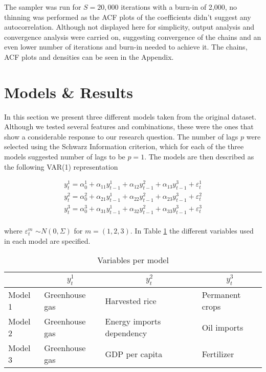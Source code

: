 \documentclass[12pt]{article}
\begin{document}
The sampler was run for $S=20,000$ iterations with a burn-in of 2,000, no thinning was performed as the ACF plots of the coefficients didn't suggest any autocorrelation. Although not displayed here for simplicity, output analysis and convergence analysis were carried on, suggesting convergence of the chains and an even lower number of iterations and burn-in needed to achieve it. The chains, ACF plots and densities can be seen in the Appendix.

\clearpage

\section{Models \& Results} \label{Models & Results}

In this section we present three different models taken from the original dataset. Although we tested several features and combinations, these were the ones that show a considerable response to our research question. The number of lags $p$ were selected using the Schwarz Information criterion, which for each of the three models suggested number of lags to be $p=1$. The models are then described as the following VAR(1) representation

\begin{equation}\label{GIRF_2}
\begin{split}
y^{1}_{t} = \alpha_{0}^{1}+\alpha_{11}y^{1}_{t-1}+\alpha_{12}y^{2}_{t-1}+\alpha_{13}y^{3}_{t-1}+\varepsilon^{1}_{t} \\
y^{2}_{t} = \alpha_{0}^{2}+\alpha_{21}y^{1}_{t-1}+\alpha_{22}y^{2}_{t-1}+\alpha_{23}y^{3}_{t-1}+\varepsilon^{2}_{t} \\
y^{3}_{t} =\alpha_{0}^{3}+ \alpha_{31}y^{1}_{t-1}+\alpha_{32}y^{2}_{t-1}+\alpha_{33}y^{3}_{t-1}+\varepsilon^{3}_{t} \\
\end{split}
\end{equation}

where $\varepsilon^{m}_{t}$ $\sim N(0,\Sigma)$ for $m=(1,2,3)$. In Table \ref{tab:models_spec} the different variables used in each model are specified.

\begin{table}[H]
    \begin{center}
     \begin{tabular}{llll} \hline
         & \multicolumn{1}{c}{\textbf{$y^{1}_{t}$}}  & \multicolumn{1}{c}{\textbf{$y^{2}_{t}$}} & \multicolumn{1}{c}{\textbf{$y^{3}_{t}$}} \\ \hline
        Model 1 & Greenhouse gas & Harvested rice & Permanent crops \\
        Model 2 & Greenhouse gas & Energy imports dependency & Oil imports \\
        Model 3 & Greenhouse gas & GDP per capita & Fertilizer \\ \hline
    \end{tabular}
    \end{center}
    \caption{Variables per model} \label{tab:models_spec}
\end{table}
\end{document}

